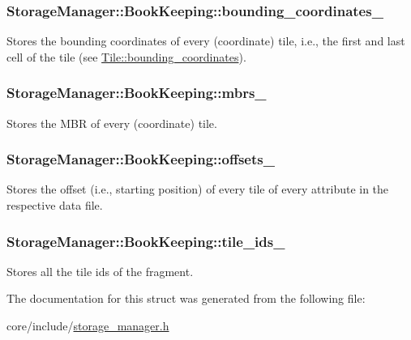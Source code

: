 \subsubsection[{bounding\+\_\+coordinates\+\_\+}]{ Storage\+Manager\+::\+Book\+Keeping\+::bounding\+\_\+coordinates\+\_\+}\label{structStorageManager_1_1BookKeeping_a8d46a9e72e076042244bdd1cad013a58}
Stores the bounding coordinates of every (coordinate) tile, i.\+e., the first and last cell of the tile (see \hyperlink{classTile_a4f253c66ce7c9e17dc9cd67e1ed730a6}{Tile\+::bounding\+\_\+coordinates}). \hypertarget{structStorageManager_1_1BookKeeping_afb93dbd71b4beccc5333274405c25b32}{}
\subsubsection[{mbrs\+\_\+}]{ Storage\+Manager\+::\+Book\+Keeping\+::mbrs\+\_\+}\label{structStorageManager_1_1BookKeeping_afb93dbd71b4beccc5333274405c25b32}
Stores the M\+B\+R of every (coordinate) tile. \hypertarget{structStorageManager_1_1BookKeeping_a85d5746c7bbe9b8c1a3fd2de29c625de}{}
\subsubsection[{offsets\+\_\+}]{ Storage\+Manager\+::\+Book\+Keeping\+::offsets\+\_\+}\label{structStorageManager_1_1BookKeeping_a85d5746c7bbe9b8c1a3fd2de29c625de}
Stores the offset (i.\+e., starting position) of every tile of every attribute in the respective data file. \hypertarget{structStorageManager_1_1BookKeeping_a1ff94988c8f84868aade610291cd347c}{}
\subsubsection[{tile\+\_\+ids\+\_\+}]{ Storage\+Manager\+::\+Book\+Keeping\+::tile\+\_\+ids\+\_\+}\label{structStorageManager_1_1BookKeeping_a1ff94988c8f84868aade610291cd347c}
Stores all the tile ids of the fragment. 

The documentation for this struct was generated from the following file\+:\begin{DoxyCompactItemize}
\item 
core/include/\hyperlink{storage__manager_8h}{storage\+\_\+manager.\+h}\end{DoxyCompactItemize}
